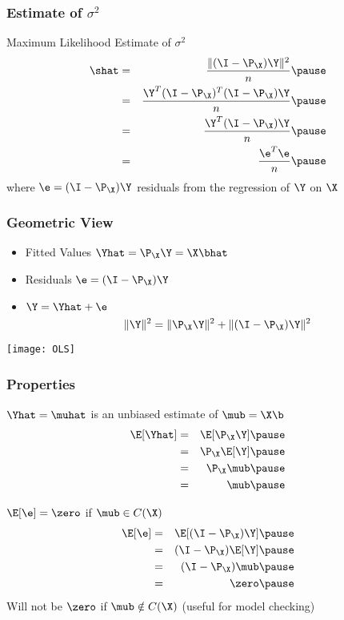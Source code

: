 \documentclass{beamer}
\begin{document}
\begin{frame}
  \frametitle{Estimate of $\sigma^2$}
  Maximum Likelihood Estimate of $\sigma^2$
  \begin{eqnarray*}
    \shat & = & \frac{\| (\I - \P_\X) \Y \|^2}{n} \pause\\
      & = & \frac{\Y^T(\I - \P_\X)^T(\I-\P_\X) \Y }{n} \pause\\
 & = & \frac{ \Y^T(\I - \P_\X) \Y}{n} \pause\\
 & = & \frac{\e^T\e} {n} \pause
  \end{eqnarray*}
where $\e = (\I - \P_\X)\Y$  \alert<5>{residuals} from the regression of $\Y$
on $\X$
\end{frame}
\begin{frame}
  \frametitle{Geometric View}
  \begin{itemize}
  \item Fitted Values  $\Yhat = \P_\X \Y = \X \bhat$ \pause
\item Residuals $\e = (\I - \P_\X) \Y$ \pause
\item $\Y = \Yhat + \e$ \pause
$$\| \Y \|^2 = \| \P_\X \Y \|^2 +  \| (\I- \P_\X)\Y\|^2  $$ \pause
  \end{itemize}
  \centerline{\texttt{[image: OLS]}}

\end{frame}

\begin{frame}
  \frametitle{Properties}
 $\Yhat = \muhat$ is an unbiased estimate of $\mub = \X\b$
\pause
    \begin{eqnarray*}
      \E [ \Yhat ]  & = & \E [\P_\X \Y ] \pause\\
& = & \P_\X \E[\Y] \pause\\
& = & \P_\X \mub \pause\\
& = & \mub \pause
    \end{eqnarray*}

$\E[\e] = \zero$ if $\mub \in C(\X)$ \pause
\begin{eqnarray*}
      \E [ \e ]  & = & \E [(\I - \P_\X) \Y ] \pause\\
& = & (\I - \P_\X) \E[\Y] \pause\\
& = & (\I - \P_\X) \mub \pause\\
& = & \zero \pause
    \end{eqnarray*}
Will not be $\zero$ if $\mub \notin C(\X)$  (useful for model checking)

\end{frame}
\end{document}
